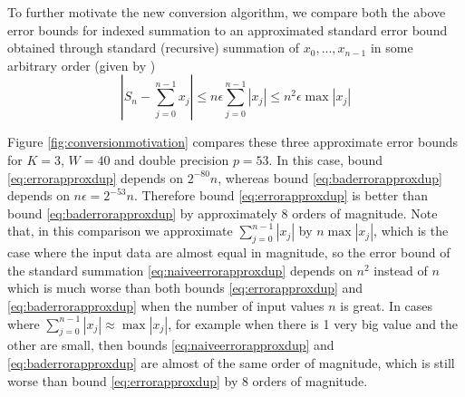     To further motivate the new conversion algorithm, we compare both the above
    error bounds for indexed summation to an approximated standard error bound
    obtained through standard (recursive) summation of $x_0, ..., x_{n - 1}$ in
    some arbitrary order (given by \cite{higham})
    \begin{equation}
      |S_n - \sum_{j=0}^{n-1}x_j| \leq n \epsilon  \sum\limits_{j = 0}^{n - 1}|x_j| \leq n^2  \epsilon  \max|x_j|
      \label{eq:naiveerrorapproxdup}
    \end{equation}

    Figure \ref{fig:conversionmotivation} compares these three approximate error bounds
    for $K=3$, $W=40$ and double precision $p=53$.
    In this case, bound \eqref{eq:errorapproxdup} depends on $2^{-80}n$,
    whereas bound \eqref{eq:baderrorapproxdup} depends on $n\epsilon = 2^{-53}n$.
    Therefore bound \eqref{eq:errorapproxdup} is better than bound \eqref{eq:baderrorapproxdup}
    by approximately 8 orders of magnitude.
    Note that, in this comparison we approximate $\sum_{j=0}^{n-1} |x_j|$ by $n \max |x_j|$,
    which is the case where the input data are almost equal in magnitude,
    so the error bound of the standard summation \eqref{eq:naiveerrorapproxdup} depends
    on $n^2$ instead of $n$ which is much worse than both bounds
    \eqref{eq:errorapproxdup} and \eqref{eq:baderrorapproxdup}
    when the number of input values $n$ is great.
    In cases where $\sum_{j=0}^{n-1} |x_j| \approx \max |x_j|$, for example
    when there is 1 very big value and the other are small, then bounds
    \eqref{eq:naiveerrorapproxdup} and \eqref{eq:baderrorapproxdup} are almost
    of the same order of magnitude, which is still worse than bound \eqref{eq:errorapproxdup}
    by 8 orders of magnitude.

